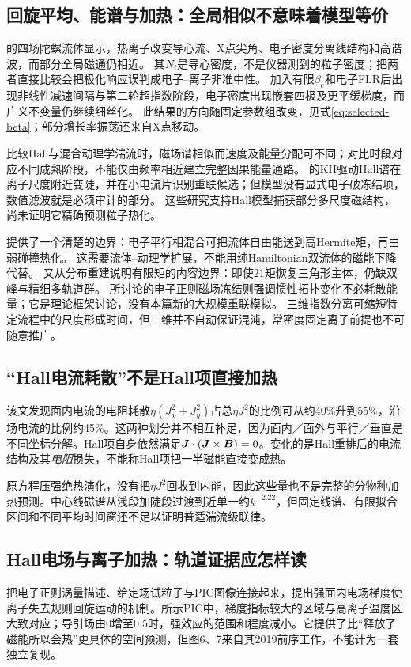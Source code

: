 \subsection{回旋平均、能谱与加热：全局相似不意味着模型等价}
\citet{E471}的四场陀螺流体显示，热离子改变导心流、X点尖角、电子密度分离线结构和高谐波，而部分全局磁通仍相近。
其$N_i$是导心密度，不是仪器测到的粒子密度；把两者直接比较会把极化响应误判成电子--离子非准中性。
\citet{E474}加入有限$\beta_e$和电子FLR后出现非线性减速间隔与第二轮超指数阶段，电子密度出现嵌套四极及更平缓梯度，而广义不变量仍继续细丝化。
此结果的方向随固定参数组改变，见式\eqref{eq:selected-beta}；部分增长率振荡还来自X点移动。

\citet{L264}比较Hall与混合动理学湍流时，磁场谱相似而速度及能量分配可不同；对比时段对应不同成熟阶段，不能仅由频率相近建立完整因果能量通路。
\citet{F644}的KH驱动Hall谱在离子尺度附近变陡，并在小电流片识别重联候选；但模型没有显式电子破冻结项，数值滤波就是必须审计的部分。
这些研究支持Hall模型捕获部分多尺度磁结构，尚未证明它精确预测粒子热化。

\citet{E512}提供了一个清楚的边界：电子平行相混合可把流体自由能送到高Hermite矩，再由弱碰撞热化。
这需要流体--动理学扩展，不能用纯Hamiltonian双流体的磁能下降代替。
\citet{E553}又从分布重建说明有限矩的内容边界：即使21矩恢复三角形主体，仍缺双峰与精细多轨道群。
\citet{L313}所讨论的电子正则磁场冻结则强调惯性拓扑变化不必耗散能量；它是理论框架讨论，没有本篇新的大规模重联模拟。
三维指数分离可缩短特定流程中的尺度形成时间，但三维并不自动保证混沌，常密度固定离子前提也不可随意推广。

\subsection{“Hall电流耗散”不是Hall项直接加热}
该文发现面内电流的电阻耗散$\eta(J_x^2+J_y^2)$占总$\eta J^2$的比例可从约40\%升到55\%，沿场电流的比例约45\%。这两种划分并不相互补足，因为面内／面外与平行／垂直是不同坐标分解。Hall项自身依然满足$\bm{J}\cdot(\bm{J}\times\bm{B})=0$。变化的是Hall重排后的电流结构及其\emph{电阻}损失，不能称Hall项把一半磁能直接变成热。

原方程压强绝热演化，没有把$\eta J^2$回收到内能，因此这些量也不是完整的分物种加热预测。中心线磁谱从浅段加陡段过渡到近单一约$k^{-2.22}$，但固定线谱、有限拟合区间和不同平均时间窗还不足以证明普适湍流级联律。\citep{L263}

\subsection{Hall电场与离子加热：轨道证据应怎样读}\label{sec:synthesis-heating}
\citet{L272}把电子正则涡量描述、给定场试粒子与PIC图像连接起来，提出强面内电场梯度使离子失去规则回旋运动的机制。所示PIC中，梯度指标较大的区域与高离子温度区大致对应；导引场由0增至0.5时，强效应的范围和程度减小。它提供了比“释放了磁能所以会热”更具体的空间预测，但图6、7来自其2019前序工作，不能计为一套独立复现。

